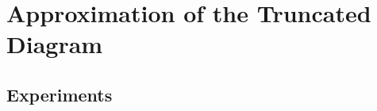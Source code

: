 \documentclass[12pt]{article}
\begin{document}
\clearpage
\section{Approximation of the Truncated Diagram}
  

  \subsection{Experiments}
    





% 
%
% 
%
%
% 

% 

\end{document}
